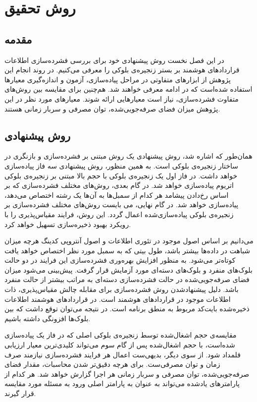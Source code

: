 \chapter{روش تحقیق}

\section{مقدمه} 
در این فصل نخست روش پیشنهادی خود برای بررسی فشرده‌سازی اطلاعات قراردادهای هوشمند ‌بر بستر زنجیره‌ی بلوکی را معرفی می‌کنیم. در روند انجام این پژوهش از ابزارهای متفاوتی در مراحل پیاده‌سازی، آزمون و اندازه‌گیری معیارها استفاده شده‌است که در ادامه معرفی خواهند شد. هم‌چنین برای مقایسه بین روش‌های متفاوت فشرده‌سازی، نیاز است معیارهایی ارائه شوند. معیارهای مورد نظر در این پژوهش میزان فضای صرفه‌جویی‌شده، توان مصرفی و سربار زمانی هستند. 

\section{روش پیشنهادی}
همان‌طور که اشاره شد، روش پیشنهادی یک روش مبتنی بر فشرده‌سازی و بازنگری در ساختار زنجیره‌ی بلوکی است. به همین منظور، روش پیشنهادی سه فاز پیاده‌سازی خواهد داشت. در فاز اول یک زنجیره‌ی بلوکی با حجم بالا مبتنی بر زنجیره‌ی بلوکی اتریوم پیاده‌سازی خواهد شد. در گام بعدی، ‌روش‌های مختلف فشرده‌سازی که بر اساس رخ‌دادن پیشامد هر کدام از سمبل‌ها به آن‌ها یک رشته اختصاص می‌دهد،‌ پیاده‌سازی خواهد شد. در گام نهایی، می بایست روش‌های مختلف فشرده‌سازی بر زنجیره‌ی بلوکی پیاده‌سازی‌شده اعمال گردد. این روش، فرایند مقیاس‌پذیری را با رویکرد بهبود ذخیره‌سازی تسهیل خواهد کرد.

می‌دانیم بر اساس اصول موجود در تئوری اطلاعات و اصول آنتروپی کدینگ‌ هرچه میزان شباهت در داده‌ها بیشتر باشد،‌ طول بیتی که به سمبل مورد نظر اختصاص خواهد یافت کوتاه‌تر می‌شود. به منظور افزایش بهره‌وری فشرده‌سازی این فرایند در دو حالت بلوک‌های منفرد و بلوک‌های دسته‌ای مورد آزمایش قرار گرفت. پیش‌بینی می‌شود‌ میزان فضای صرفه‌جویی‌شده در حالت فشرده‌سازی دسته‌ای به مراتب بیشتر از حالت منفرد باشد. دلیل پیشنهادشدن روش فشرده‌سازی برای مقابله چالش مقیاس‌پذیری، ذات اطلاعات موجود در قراردادهای هوشمند است. در قراردادهای هوشمند اطلاعات ذخیره‌شده بایت‌کد مربوط به منطق برنامه است. در نتیجه می‌توان توقع داشت که بین بلوک‌ها افزونگی داشته باشیم.

مقایسه‌ی حجم اشغال‌شده توسط زنجیره‌ی بلوکی اصلی که در فاز یک پیاده‌سازی شده‌است،‌ با حجم اشغال‌شده پس از گام سوم می‌تواند کلیدی‌ترین معیار ارزیابی قلمداد شود. از سوی دیگر، بدیهی‌ست اعمال هر فرایند فشرده‌سازی نیازمند صرف زمان و توان مصرفی‌ست. برای هرچه دقیق‌تر شدن محاسبات،‌ مقدار فضای صرفه‌جویی‌شده، توان مصرفی و سربار زمانی هر اجرا گزارش خواهد شد. هر کدام از پارامترهای یادشده می‌تواند به عنوان به پارامتر اصلی ورود به مسئله مورد مقایسه قرار گیرند.

